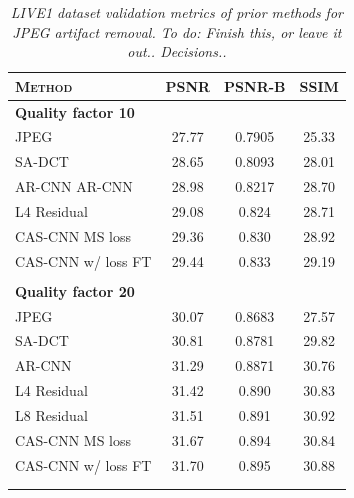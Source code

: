 \begin{table}[!t]
\renewcommand{\arraystretch}{1.1}
\caption{\emph{LIVE1 dataset validation metrics of prior methods for JPEG artifact removal. To do: Finish this, or leave it out.. Decisions..}}
\label{table_variables}
\centering
\begin{tabular}{|lccc|}
\hline
\textsc{Method}&\textsc{PSNR}&\textsc{PSNR-B}&\textsc{SSIM}\\
\hline
\textbf{Quality factor 10}&&&\\
JPEG&27.77&0.7905&25.33\\
SA-DCT&28.65&0.8093&28.01\\
AR-CNN AR-CNN \cite{dong2015compression}&28.98&0.8217&28.70\\
L4 Residual \cite{svoboda}&29.08&0.824&28.71\\
CAS-CNN MS loss \cite{CavigelliHB16}&29.36&0.830&28.92\\
CAS-CNN w/ loss FT \cite{CavigelliHB16}&29.44&0.833&29.19\\
&&&\\
\textbf{Quality factor 20}&&&\\
JPEG&30.07&0.8683&27.57\\
SA-DCT&30.81&0.8781&29.82\\
AR-CNN \cite{dong2015compression}&31.29&0.8871&30.76\\
L4 Residual \cite{svoboda}&31.42&0.890&30.83\\
L8 Residual \cite{svoboda}&31.51&0.891&30.92\\
CAS-CNN MS loss \cite{CavigelliHB16}&31.67&0.894&30.84\\
CAS-CNN w/ loss FT \cite{CavigelliHB16}&31.70&0.895&30.88\\
&&&\\


&&&\\


\hline

\end{tabular}
\end{table}


